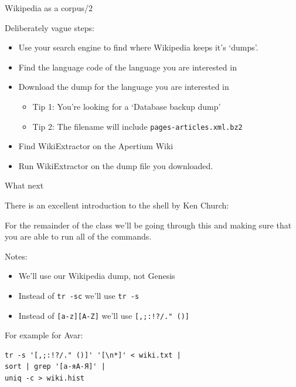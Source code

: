 \documentclass[10pt, compress]{beamer}
\begin{document}
\begin{frame}{Wikipedia as a corpus/2}

Deliberately vague steps:

\begin{itemize}
  \item Use your search engine to find where Wikipedia keeps it's `dumps'.
  \item Find the language code of the language you are interested in
  \item Download the dump for the language you are interested in
  \begin{itemize}
    \item Tip 1: You're looking for a `Database backup dump'
    \item Tip 2: The filename will include {\tt pages-articles.xml.bz2}
  \end{itemize}
  \item Find WikiExtractor on the Apertium Wiki
  \item Run WikiExtractor on the dump file you downloaded. 
\end{itemize}

\end{frame}

\begin{frame}[fragile]{What next}

There is an excellent introduction to the shell by Ken Church:


For the remainder of the class we'll be going through this and
making sure that you are able to run all of the commands.

Notes:
\begin{itemize}
  \item We'll use our Wikipedia dump, not Genesis
  \item Instead of {\tt tr -sc} we'll use {\tt tr -s} 
  \item Instead of {\tt [a-z][A-Z]} we'll use {\tt [,;:!?/." ()]} 
\end{itemize}

For example for Avar:
\begin{verbatim}
tr -s '[,;:!?/." ()]' '[\n*]' < wiki.txt | 
sort | grep '[а-яА-Я]' |
uniq -c > wiki.hist
\end{verbatim}

\end{frame}
\end{document}
